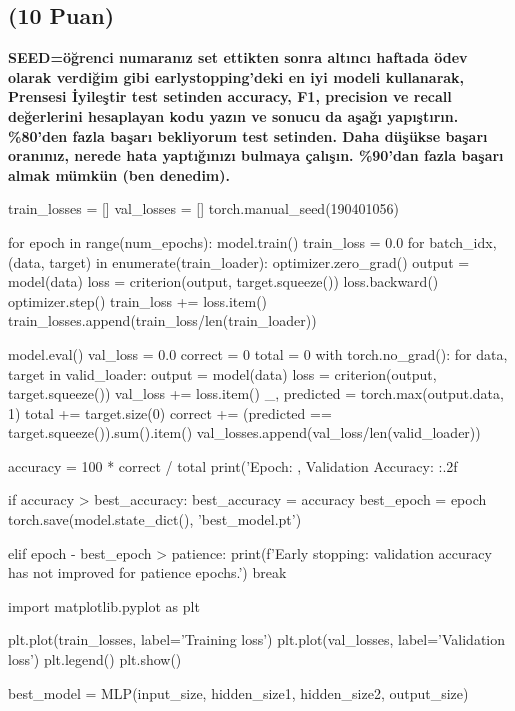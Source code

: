 \documentclass[11pt]{article}
\begin{document}
\subsection{(10 Puan)} \textbf{SEED=öğrenci numaranız set ettikten sonra altıncı haftada ödev olarak verdiğim gibi earlystopping'deki en iyi modeli kullanarak, Prensesi İyileştir test setinden accuracy, F1, precision ve recall değerlerini hesaplayan kodu yazın ve sonucu da aşağı yapıştırın. \%80'den fazla başarı bekliyorum test setinden. Daha düşükse başarı oranınız, nerede hata yaptığınızı bulmaya çalışın. \%90'dan fazla başarı almak mümkün (ben denedim).}

\begin{python}
train_losses = []
val_losses = []
torch.manual_seed(190401056)

for epoch in range(num_epochs):
    model.train()
    train_loss = 0.0
    for batch_idx, (data, target) in enumerate(train_loader):
        optimizer.zero_grad()
        output = model(data)
        loss = criterion(output, target.squeeze())
        loss.backward()
        optimizer.step()
        train_loss += loss.item()
    train_losses.append(train_loss/len(train_loader))

    model.eval()
    val_loss = 0.0
    correct = 0
    total = 0
    with torch.no_grad():
        for data, target in valid_loader:
            output = model(data)
            loss = criterion(output, target.squeeze())
            val_loss += loss.item()
            _, predicted = torch.max(output.data, 1)
            total += target.size(0)
            correct += (predicted == target.squeeze()).sum().item()
        val_losses.append(val_loss/len(valid_loader))
    
    accuracy = 100 * correct / total
    print('Epoch: {}, Validation Accuracy: {:.2f}%
 
    if accuracy > best_accuracy:
        best_accuracy = accuracy
        best_epoch = epoch
        torch.save(model.state_dict(), 'best_model.pt')
   
    elif epoch - best_epoch > patience:
        print(f'Early stopping: validation accuracy has not improved for {patience} epochs.')
        break

import matplotlib.pyplot as plt

plt.plot(train_losses, label='Training loss')
plt.plot(val_losses, label='Validation loss')
plt.legend()
plt.show()

best_model = MLP(input_size, hidden_size1, hidden_size2, output_size)


\end{python}
\end{document}
